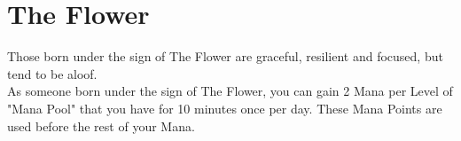 \section{The Flower}

Those born under the sign of The Flower are graceful, resilient and focused, but tend to be aloof.\\
As someone born under the sign of The Flower, you can gain 2 Mana per Level of "Mana Pool" that you have for 10 minutes once per day. These Mana Points are used before the rest of your Mana.\\